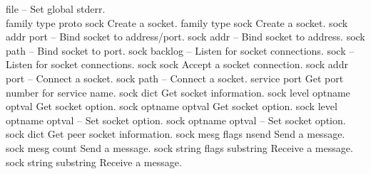 \begin{longtable}{}
	{file}
	{{\bf {}}}
	{--}
	{Set global stderr.}
\hline \hline
{} \\
\hline \hline
\optableent
	{family type proto}
	{{\bf {}}}
	{sock}
	{Create a socket.}
\optableent
	{family type}
	{{\bf {}}}
	{sock}
	{Create a socket.}
\hline
\optableent
	{sock addr port}
	{{\bf {}}}
	{--}
	{Bind socket to address/port.}
\optableent
	{sock addr}
	{{\bf {}}}
	{--}
	{Bind socket to address.}
\optableent
	{sock path}
	{{\bf {}}}
	{--}
	{Bind socket to port.}
\hline
\optableent
	{sock backlog}
	{{\bf {}}}
	{--}
	{Listen for socket connections.}
\optableent
	{sock}
	{{\bf {}}}
	{--}
	{Listen for socket connections.}
\hline
\optableent
	{sock}
	{{\bf {}}}
	{sock}
	{Accept a socket connection.}
\hline
\optableent
	{sock addr port}
	{{\bf {}}}
	{--}
	{Connect a socket.}
\optableent
	{sock path}
	{{\bf {}}}
	{--}
	{Connect a socket.}
\hline
\optableent
	{service}
	{{\bf {}}}
	{port}
	{Get port number for service name.}
\hline
\optableent
	{sock}
	{{\bf {}}}
	{dict}
	{Get socket information.}
\hline
\optableent
	{sock level optname}
	{{\bf {}}}
	{optval}
	{Get socket option.}
\optableent
	{sock optname}
	{{\bf {}}}
	{optval}
	{Get socket option.}
\hline
\optableent
	{sock level optname optval}
	{{\bf {}}}
	{--}
	{Set socket option.}
\optableent
	{sock optname optval}
	{{\bf {}}}
	{--}
	{Set socket option.}
\hline
\optableent
	{sock}
	{{\bf {}}}
	{dict}
	{Get peer socket information.}
\hline
\optableent
	{sock mesg flags}
	{{\bf {}}}
	{nsend}
	{Send a message.}
\optableent
	{sock mesg}
	{{\bf {}}}
	{count}
	{Send a message.}
\hline
\optableent
	{sock string flags}
	{{\bf {}}}
	{substring}
	{Receive a message.}
\optableent
	{sock string}
	{{\bf {}}}
	{substring}
	{Receive a message.}
\hline

\end{longtable}
